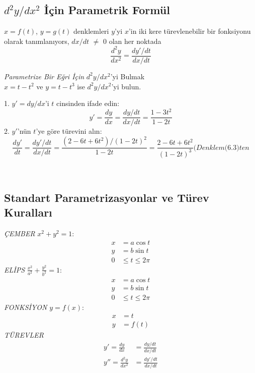 \subsection{\protect $d^2y/dx^2$ İçin Parametrik Formül}
$x=f(t)$, $y=g(t)$ denklemleri $y$'yi $x$'in iki kere türevlenebilir bir fonksiyonu olarak tanımlanıyors, $dx/dt$ $\ne$ $0$ olan her noktada
	\begin{equation}
	\frac{d^2y}{dx^2}=\frac{dy'/dt}{dx/dt}
	\end{equation}
\begin{ornek}\textit{Parametrize Bir Eğri İçin} $d^2y/dx^2$'yi Bulmak\\
$x=t-t^2$ ve $y=t-t^3$ ise $d^2y/dx^2$'yi bulun.
\end{ornek}
\begin{cozum}
1. $y' =dy/dx$'i $t$ cinsinden ifade edin:
	\begin{equation*}
	y'=\frac{dy}{dx}=\frac{dy/dt}{dx/dt}=\frac{1-3t^2}{1-2t}
	\end{equation*}
2. $y'$'nün $t$'ye göre türevini alın:
	\begin{equation*}
	\frac{dy'}{dt}=\frac{dy'/dt}{dx/dt}=\frac{(2-6t+6t^2)/(1-2t)^2}{1-2t}=\frac{2-6t+6t^2}{(1-2t)^3}\textit{(Denklem(6.3)ten}
	\end{equation*}
\end{cozum}\\


\subsection{\protect Standart Parametrizasyonlar ve Türev Kuralları}
\textit{ÇEMBER}  $x^2+y^2=1$:
	\begin{equation*}
	\begin{split}
	x&=a \cos t\\
	y&=b \sin t\\
	0 &\leq t \leq 2\pi
	\end{split}
	\end{equation*}
\textit{ELİPS}  $\displaystyle \frac{x^2}{a^2}+\frac{y^2}{b^2}=1$:
	\begin{equation*}
	\begin{split}
	x&=a \cos t\\
	y&=b \sin t\\
	0 &\leq t \leq 2\pi
	\end{split}
	\end{equation*}
\textit{FONKSİYON} $y=f(x)$:
	\begin{equation*}
	\begin{split}
	x&=t\\
	y&=f(t)
	\end{split}
	\end{equation*}
\textit{TÜREVLER} 
	\begin{equation*}
	\begin{split}
	y'=\frac{dy}{dx}&=\frac{dy/dt}{dx/dt}\\
	y''=\frac{d^2y}{dx^2}&=\frac{dy'/dt}{dx/dt}
	\end{split}
	\end{equation*}


